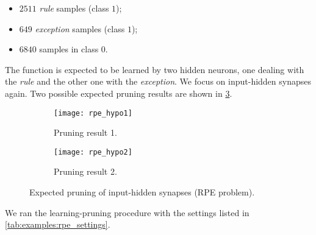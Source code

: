 \begin{itemize}
\item $ 2511 $ \textit{rule} samples (class $ 1 $);
\item $ 649 $ \textit{exception} samples (class $ 1 $);
\item $ 6840 $ samples in class $ 0 $.
\end{itemize}

The function is expected to be learned by two hidden neurons, one dealing with the \textit{rule} and the other one with the \textit{exception}. We focus on input-hidden synapses again. Two possible expected pruning results are shown in \cref{fig:examples:rpe_hypos}.

\begin{figure}[H]
\centering
\begin{subfigure}{.4\textwidth}
  \centering
  \texttt{[image: rpe\_hypo1]}
  \caption{Pruning result 1.}
  \label{fig:examples:rpe_hypo1}
\end{subfigure}
\begin{subfigure}{.4\textwidth}
  \centering
  \texttt{[image: rpe\_hypo2]}
  \caption{Pruning result 2.}
  \label{fig:examples:rpe_hypo2}
\end{subfigure}
\caption{Expected pruning of input-hidden synapses (RPE problem).}
\label{fig:examples:rpe_hypos}
\end{figure}

We ran the learning-pruning procedure with the settings listed in \cref{tab:examples:rpe_settings}.

\begin{table}[H]
\centering
{}
\caption{Experiment settings for the RPE example.}
\label{tab:examples:rpe_settings}
\end{table}

